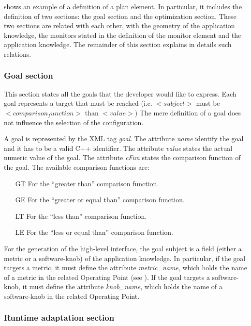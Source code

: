  shows an example of a definition of a plan element.
In particular, it includes the definition of two sections: the goal section and the optimization section.
These two sections are related with each other, with the geometry of the application knowledge, the monitors stated in the definition of the monitor element and the application knowledge.
The remainder of this section explains in details such relations.

\subsubsection*{Goal section}
\label{ssec:goal}

This section states all the goals that the developer would like to express.
Each goal represents a target that must be reached (i.e. \textit{$<subject>$} must be \textit{$<comparison_function>$} than \textit{$<value>$})
The mere definition of a goal does not influence the selection of the configuration.

A goal is represented by the XML tag \textit{goal}.
The attribute \textit{name} identify the goal and it has to be a valid C++ identifier.
The attribute \textit{value} states the actual numeric value of the goal.
The attribute \textit{cFun} states the comparison function of the goal.
The available comparison functions are:
\begin{enumerate}
	\item[GT] For the ``greater than'' comparison function.
	\item[GE] For the ``greater or equal than'' comparison function.
	\item[LT] For the ``less than'' comparison function.
	\item[LE] For the ``less or equal than'' comparison function. 
\end{enumerate}

For the generation of the high-level interface, the goal subject is a field (either a metric or a software-knob) of the application knowledge.
In particular, if the goal targets a metric, it must define the attribute \textit{metric\_name}, which holds the name of a metric in the related Operating Point (see ).
If the goal targets a software-knob, it must define the attribute \textit{knob\_name}, which holds the name of a software-knob in the related Operating Point.


\subsubsection*{Runtime adaptation section}

